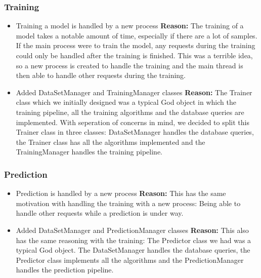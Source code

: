 \subsubsection{Training}
\begin{itemize}
    \item
    Training a model is handled by a new process
    \newline
    \textbf{Reason:} The training of a model takes a notable amount of time,
    especially if there are a lot of samples. If the main process were to train
    the model, any requests during the training could only be handled after the
    training is finished. This was a terrible idea, so a new process is created
    to handle the training and the main thread is then able to handle other
    requests during the training.

    \item
    Added DataSetManager and TrainingManager classes
    \newline
    \textbf{Reason:} The Trainer class which we initially designed was a typical
    God object in which the training pipeline, all the training algorithms and
    the database queries are implemented. With seperation of concerns in mind, we
    decided to split this Trainer class in three classes: DataSetManager handles 
    the database queries, the Trainer class has all the algorithms implemented and
    the TrainingManager handles the training pipeline.
\end{itemize}

\subsubsection{Prediction}
\begin{itemize}
    \item
    Prediction is handled by a new process
    \newline
    \textbf{Reason:} This has the same motivation with handling the training with a
    new process: Being able to handle other requests while a prediction is under way.

    \item
    Added DataSetManager and PredictionManager classes
    \newline
    \textbf{Reason:} This also has the same reasoning with the training: The Predictor
    class we had was a typical God object. The DataSetManager handles the database
    queries, the Predictor class implements all the algorithms and the PredictionManager
    handles the prediction pipeline.
\end{itemize}
